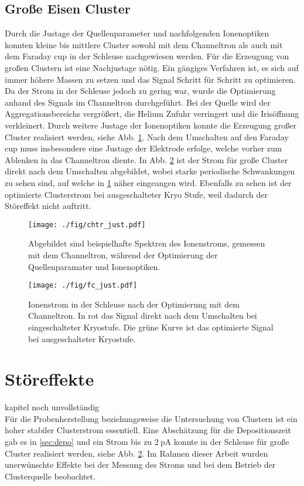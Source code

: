 \subsection{Große Eisen Cluster}
Durch die Justage der Quellenparameter und nachfolgenden Ionenoptiken konnten kleine bis mittlere Cluster sowohl mit dem Channeltron als auch mit dem Faraday cup in der Schleuse nachgewiesen werden.
Für die Erzeugung von großen Clustern ist eine Nachjustage nötig.
Ein gängiges Verfahren ist, es sich auf immer höhere Massen zu setzen und das Signal Schritt für Schritt zu optimieren.
Da der Strom in der Schleuse jedoch zu gering war, wurde die Optimierung anhand des Signals im Channeltron durchgeführt.
Bei der Quelle wird der Aggregationsbereichs vergrößert, die Helium Zufuhr verringert und
die Irisöffnung verkleinert.
Durch weitere Justage der Ionenoptiken konnte die Erzeugung großer Cluster realisiert werden, siehe Abb. \ref{fig:chtr_just}.
Nach dem Umschalten auf den Faraday cup muss insbesondere eine Justage der Elektrode erfolge, welche vorher zum Ablenken in das Channeltron diente.
In Abb. \ref{fig:fc_just} ist der Strom für große Cluster direkt nach dem Umschalten abgebildet, wobei starke periodische Schwankungen zu sehen sind, auf welche in \ref{sec:effekte} näher eingeangen wird.
Ebenfalls zu sehen ist der optimierte Clusterstrom bei ausgeschalteter Kryo Stufe, weil dadurch der Störeffekt nicht auftritt.

\begin{figure}
  \centering
  \texttt{[image: ./fig/chtr\_just.pdf]}
  \caption{Abgebildet sind beispielhafte Spektren des Ionenstroms, gemessen mit dem Channeltron, während der Optimierung der Quellenparamater und Ionenoptiken.}
  \label{fig:chtr_just}
\end{figure}
\begin{figure}
  \centering
  \texttt{[image: ./fig/fc\_just.pdf]}
  \caption{Ionenstrom in der Schleuse nach der Optimierung mit dem Channeltron. In rot das Signal direkt nach dem Umschalten bei eingeschalteter Kryostufe. Die grüne Kurve ist das optimierte Signal bei ausgeschalteter Kryostufe.}
  \label{fig:fc_just}
\end{figure}




\section{Störeffekte}
\label{sec:effekte}
kapitel noch unvollständig\\
Für die Probenherstellung beziehungsweise die Untersuchung von Clustern ist ein hoher stabiler Clusterstrom essentiell.
Eine Abschätzung für die Depositionszeit gab es in \ref{sec:depo} und ein Strom bis zu $\SI{2}{\pA}$ konnte in der Schleuse für große Cluster realisiert werden, siehe Abb. \ref{fig:fc_just}.
Im Rahmen dieser Arbeit wurden unerwünschte Effekte bei der Messung des Stroms und bei dem Betrieb der Clusterquelle beobachtet.\\

